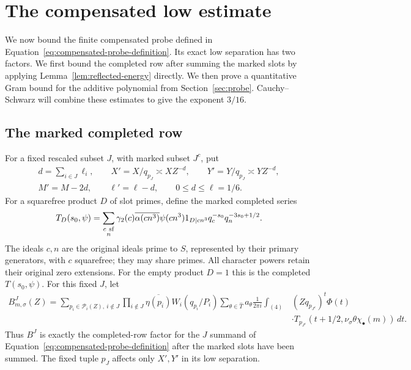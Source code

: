 \documentclass[11pt,a4paper]{article}
\numberwithin{equation}{section}
\numberwithin{figure}{section}
\theoremstyle{definition}
\theoremstyle{remark}
\begin{document}
\section{The compensated low estimate}\label{sec:compensated-low}

We now bound the finite compensated probe defined in
Equation~\eqref{eq:compensated-probe-definition}.  Its exact low separation
has two factors.  We first bound the completed row after summing the marked
slots by applying Lemma~\ref{lem:reflected-energy} directly.  We then prove
a quantitative Gram bound for the additive polynomial from
Section~\ref{sec:probe}.  Cauchy--Schwarz will combine these estimates to
give the exponent $3/16$.

\subsection{The marked completed row}

For a fixed rescaled subset $J$, with marked subset $J^c$, put
\begin{equation}
 \begin{gathered}
 d=\sum_{i\in J}\ell_i,\qquad
 X'=X/q_{p_J}\asymp XZ^{-d},\qquad
 Y'=Y/q_{p_J}\asymp YZ^{-d},\\
 M'=M-2d,\qquad \ell'=\ell-d,\qquad 0\le d\le\ell=1/6.
 \end{gathered}
 \label{old-eq:5.2}
\end{equation}
For a squarefree product $D$ of slot primes, define the marked completed
series
\[
 T_D(s_0,\psi)=\sum_{\substack{c\ {\rm sf}\\n}}
 \gamma_2(c)\overline{\alpha(cn^3)}\psi(cn^3)
 1_{D\mid cn^3}q_c^{-s_0}q_n^{-3s_0+1/2}.
\]
The ideals $c,n$ are the original ideals prime to $S$, represented by their
primary generators, with $c$ squarefree;
they may share primes.  All character powers retain their original zero
extensions.  For the empty product $D=1$ this is the completed $T(s_0,\psi)$.
For this fixed $J$, let
\[
\begin{split}
 B^J_{m,\sigma}(Z)=
 \sum_{p_i\in\mathcal P_i(Z),\ i\notin J}
 \prod_{i\notin J}\overline{\eta(p_i)}W_i(q_{p_i}/P_i)
 \sum_{\theta\in\widehat T}a_\theta\frac1{2\pi i}
 \int_{(4)} &(Zq_{p_{J^c}})^t\Phi(t)\\
 &\cdot T_{p_{J^c}}(t+1/2,
             \nu_\sigma\theta\chi_\bullet(m))\,dt.
\end{split}
\]
Thus $B^J$ is exactly the completed-row factor for the $J$ summand
of Equation~\eqref{eq:compensated-probe-definition} after the
marked slots have been summed.  The fixed tuple $p_J$ affects
only $X',Y'$ in its low separation.
\end{document}
